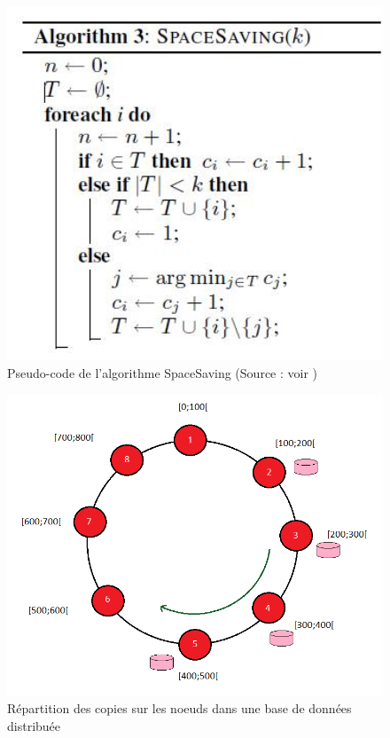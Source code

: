\documentclass[12pt]{article}
\begin{document}
\begin{figure}[H]
	\centering
        \includegraphics[width=12cm]{images/besoins/code_spaceSaving.jpg}
    \caption{Pseudo-code de l'algorithme SpaceSaving (Source : voir \cite{SpaceSaving2}) \label{fig:codeSpaceSaving}}
\end{figure}

\begin{figure}[H]
	\centering
        \includegraphics[width=12cm]{images/besoins/replication.png}
    \caption{Répartition des copies sur les noeuds dans une base de données distribuée \label{fig:replication}}
\end{figure}
\end{document}
